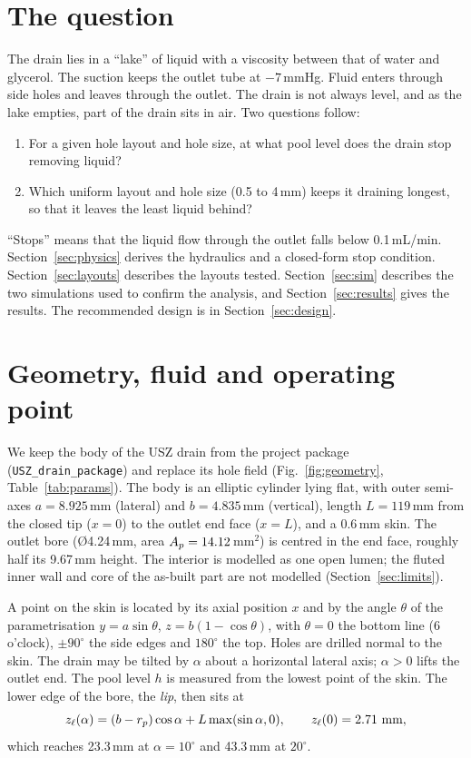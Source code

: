 \documentclass[10pt,a4paper]{article}
\newcommand{\zl}{z_\ell}
\begin{document}
\section{The question}
The drain lies in a ``lake'' of liquid with a viscosity between that of water and glycerol. The suction keeps the outlet tube at $-7$\,mmHg. Fluid enters through side holes and leaves through the outlet. The drain is not always level, and as the lake empties, part of the drain sits in air. Two questions follow:
\begin{enumerate}
\item For a given hole layout and hole size, at what pool level does the drain stop removing liquid?
\item Which uniform layout and hole size (0.5 to 4\,mm) keeps it draining longest, so that it leaves the least liquid behind?
\end{enumerate}
``Stops'' means that the liquid flow through the outlet falls below 0.1\,mL/min. Section~\ref{sec:physics} derives the hydraulics and a closed-form stop condition. Section~\ref{sec:layouts} describes the layouts tested. Section~\ref{sec:sim} describes the two simulations used to confirm the analysis, and Section~\ref{sec:results} gives the results. The recommended design is in Section~\ref{sec:design}.

\section{Geometry, fluid and operating point}\label{sec:geometry}
We keep the body of the USZ drain from the project package (\texttt{USZ\_drain\_package}) and replace its hole field (Fig.~\ref{fig:geometry}, Table~\ref{tab:params}). The body is an elliptic cylinder lying flat, with outer semi-axes $a=8.925$\,mm (lateral) and $b=4.835$\,mm (vertical), length $L=119$\,mm from the closed tip ($x=0$) to the outlet end face ($x=L$), and a 0.6\,mm skin. The outlet bore (\O4.24\,mm, area $A_p=14.12$\,mm$^2$) is centred in the end face, roughly half its 9.67\,mm height. The interior is modelled as one open lumen; the fluted inner wall and core of the as-built part are not modelled (Section~\ref{sec:limits}).

A point on the skin is located by its axial position $x$ and by the angle $\theta$ of the parametrisation $y=a\sin\theta$, $z=b(1-\cos\theta)$, with $\theta=0$ the bottom line (6 o'clock), $\pm90^\circ$ the side edges and $180^\circ$ the top. Holes are drilled normal to the skin. The drain may be tilted by $\alpha$ about a horizontal lateral axis; $\alpha>0$ lifts the outlet end. The pool level $h$ is measured from the lowest point of the skin. The lower edge of the bore, the \emph{lip}, then sits at
\begin{equation}
\zl(\alpha) = (b-r_p)\cos\alpha + L\max(\sin\alpha,0), \qquad \zl(0) = \numzlip\ \text{mm},
\label{eq:lip}
\end{equation}
which reaches 23.3\,mm at $\alpha=10^\circ$ and 43.3\,mm at $20^\circ$.
\end{document}
